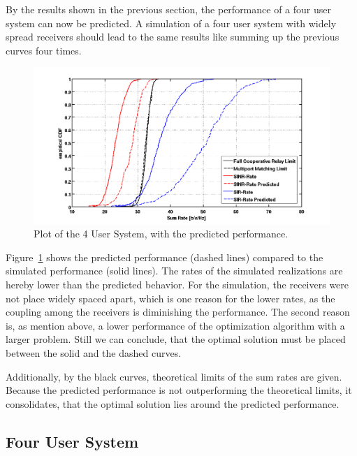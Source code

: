By the results shown in the previous section, the performance of a four user system can now be predicted.
A simulation of a four user system with widely spread receivers should lead to the same results like summing up the previous curves four times.
\begin{figure}[h]
\centering
  \includegraphics[width=0.9\linewidth]{images/4user_inklpred.png}
\caption{Plot of the 4 User System, with the predicted performance.}
\label{fig:4user_pred}
\end{figure}

Figure~\ref{fig:4user_pred} shows the predicted performance (dashed lines) compared to the simulated performance (solid lines).
The rates of the simulated realizations are hereby lower than the predicted behavior.
For the simulation, the receivers were not place widely spaced apart, which is one reason for the lower rates, as the coupling among the receivers is diminishing the performance.
The second reason is, as mention above, a lower performance of the optimization algorithm with a larger problem.
Still we can conclude, that the optimal solution must be placed between the solid and the dashed curves.

Additionally, by the black curves, theoretical limits of the sum rates are given.
Because the predicted performance is not outperforming the theoretical limits, it consolidates, that the optimal solution lies around the predicted performance.



\subsection{Four User System}
\label{sec:4user_const}

